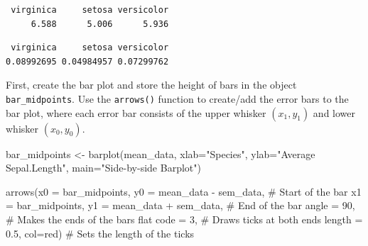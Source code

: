 \documentclass[
  letterpaper,
  DIV=11,
  numbers=noendperiod]{scrreprt}
\newenvironment{Shaded}{\begin{snugshade}}{\end{snugshade}}
\newcommand{\AttributeTok}[1]{\textcolor[rgb]{0.40,0.45,0.13}{#1}}
\newcommand{\CommentTok}[1]{\textcolor[rgb]{0.37,0.37,0.37}{#1}}
\newcommand{\ControlFlowTok}[1]{\textcolor[rgb]{0.00,0.23,0.31}{\textbf{#1}}}
\newcommand{\DecValTok}[1]{\textcolor[rgb]{0.68,0.00,0.00}{#1}}
\newcommand{\FloatTok}[1]{\textcolor[rgb]{0.68,0.00,0.00}{#1}}
\newcommand{\FunctionTok}[1]{\textcolor[rgb]{0.28,0.35,0.67}{#1}}
\newcommand{\NormalTok}[1]{\textcolor[rgb]{0.00,0.23,0.31}{#1}}
\newcommand{\OtherTok}[1]{\textcolor[rgb]{0.00,0.23,0.31}{#1}}
\newcommand{\SpecialCharTok}[1]{\textcolor[rgb]{0.37,0.37,0.37}{#1}}
\newcommand{\StringTok}[1]{\textcolor[rgb]{0.13,0.47,0.30}{#1}}
\begin{document}
\begin{verbatim}
 virginica     setosa versicolor 
     6.588      5.006      5.936 
\end{verbatim}

\begin{Shaded}
\end{Shaded}

\begin{verbatim}
 virginica     setosa versicolor 
0.08992695 0.04984957 0.07299762 
\end{verbatim}

First, create the bar plot and store the height of bars in the object
\texttt{bar\_midpoints}. Use the \texttt{arrows()} function to
create/add the error bars to the bar plot, where each error bar consists
of the upper whisker \((x_{1}, y_{1})\) and lower whisker
\((x_{0}, y_{0})\).

\begin{Shaded}
\begin{Highlighting}[]
\NormalTok{bar\_midpoints }\OtherTok{\textless{}{-}} \FunctionTok{barplot}\NormalTok{(mean\_data,}
                  \AttributeTok{xlab=}\StringTok{"Species"}\NormalTok{, }
                  \AttributeTok{ylab=}\StringTok{"Average Sepal.Length"}\NormalTok{, }
                  \AttributeTok{main=}\StringTok{"Side{-}by{-}side Barplot"}\NormalTok{)}

\FunctionTok{arrows}\NormalTok{(}\AttributeTok{x0 =}\NormalTok{ bar\_midpoints,}
       \AttributeTok{y0 =}\NormalTok{ mean\_data }\SpecialCharTok{{-}}\NormalTok{ sem\_data, }\CommentTok{\# Start of the bar}
       \AttributeTok{x1 =}\NormalTok{ bar\_midpoints,}
       \AttributeTok{y1 =}\NormalTok{ mean\_data }\SpecialCharTok{+}\NormalTok{ sem\_data, }\CommentTok{\# End of the bar}
       \AttributeTok{angle =} \DecValTok{90}\NormalTok{,                }\CommentTok{\# Makes the ends of the bars flat}
       \AttributeTok{code =} \DecValTok{3}\NormalTok{,                  }\CommentTok{\# Draws ticks at both ends}
       \AttributeTok{length =} \FloatTok{0.5}\NormalTok{, }\AttributeTok{col=}\StringTok{\textquotesingle{}red\textquotesingle{}}\NormalTok{)   }\CommentTok{\# Sets the length of the ticks}
\end{Highlighting}
\end{Shaded}
\end{document}

